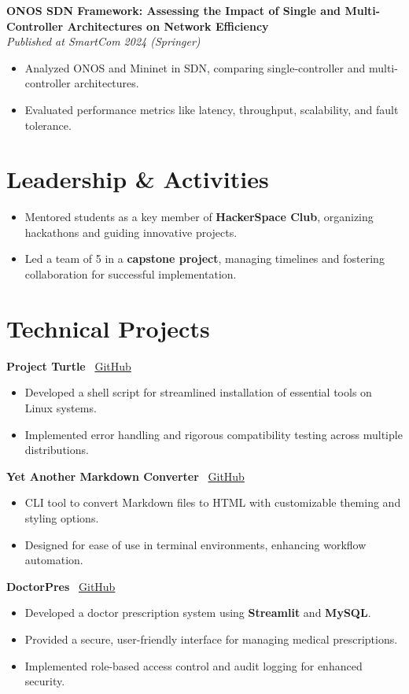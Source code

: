 \documentclass[a4paper,10pt]{article}
\begin{document}
\textbf{ONOS SDN Framework: Assessing the Impact of Single and Multi-Controller Architectures on Network Efficiency}\\
\textit{Published at SmartCom 2024 (Springer)}
\begin{itemize}
    \item Analyzed ONOS and Mininet in SDN, comparing single-controller and multi-controller architectures.
    \item Evaluated performance metrics like latency, throughput, scalability, and fault tolerance.
\end{itemize}

\section*{Leadership \& Activities}
\begin{itemize}
    \item Mentored students as a key member of \textbf{HackerSpace Club}, organizing hackathons and guiding innovative projects.
    \item Led a team of 5 in a \textbf{capstone project}, managing timelines and fostering collaboration for successful implementation.
\end{itemize}

\section*{Technical Projects}
\textbf{Project Turtle} \hfill \faGithub~\href{https://github.com/Adarsh-Liju/project-turtle}{GitHub}
\begin{itemize}
    \item Developed a shell script for streamlined installation of essential tools on Linux systems.
    \item Implemented error handling and rigorous compatibility testing across multiple distributions.
\end{itemize}

\textbf{Yet Another Markdown Converter} \hfill \faGithub~\href{https://github.com/Adarsh-Liju/yamc}{GitHub}
\begin{itemize}
    \item CLI tool to convert Markdown files to HTML with customizable theming and styling options.
    \item Designed for ease of use in terminal environments, enhancing workflow automation.
\end{itemize}

\textbf{DoctorPres} \hfill \faGithub~\href{https://github.com/Adarsh-Liju/doctorpres}{GitHub}
\begin{itemize}
    \item Developed a doctor prescription system using \textbf{Streamlit} and \textbf{MySQL}.
    \item Provided a secure, user-friendly interface for managing medical prescriptions.
    \item Implemented role-based access control and audit logging for enhanced security.
\end{itemize}
\end{document}
